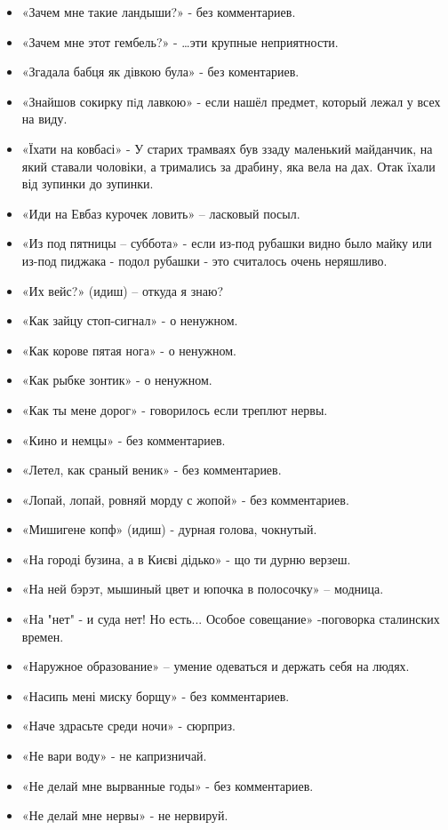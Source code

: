 \begin{itemize}
\item  «Зачем мне такие ландыши?» - без комментариев.
\item  «Зачем мне этот гембель?» - …эти крупные неприятности.
\item  «Згадала бабця як дівкою була» - без коментариев.
\item  «Знайшов сокирку пiд лавкою» - если нашёл предмет, который лежал у всех на виду.
\item  «Їхати на ковбасі» - У старих трамваях був ззаду маленький майданчик, на який ставали чоловіки, а тримались за драбину, яка вела на дах. Отак їхали від зупинки до зупинки.
\item  «Иди на Евбаз курочек ловить» – ласковый посыл.
\item  «Из под пятницы – суббота» - если из-под рубашки видно было майку или из-под пиджака - подол рубашки - это считалось очень неряшливо.
\item  «Их вейс?» (идиш) – откуда я знаю?
\item  «Как зайцу стоп-сигнал» - о ненужном.
\item  «Как корове пятая нога» - о ненужном.
\item  «Как рыбке зонтик» - о ненужном.
\item  «Как ты мене дорог» - говорилось если треплют  нервы.
\item  «Кино и немцы» - без комментариев.
\item  «Летел, как сраный веник» - без комментариев.
\item  «Лопай, лопай, ровняй морду с жопой» - без комментариев.
\item  «Мишигене копф» (идиш) - дурная голова, чокнутый.
\item  «На городі бузина, а в Києві дідько» - що ти дурню верзеш.
\item  «На ней бэрэт, мышиный цвет и юпочка в полосочку» – модница.
\item  «На "нет" - и суда нет! Но есть... Особое совещание» -поговорка сталинских времен.
\item  «Наружное образование» – умение одеваться и держать себя на людях.
\item  «Насипь мені миску борщу» - без комментариев.
\item  «Наче здрасьте среди ночи» - сюрприз.
\item  «Не вари воду» - не капризничай.
\item  «Не делай мне вырванные годы» - без комментариев. 
\item  «Не делай мне нервы» - не нервируй.

\end{itemize}
